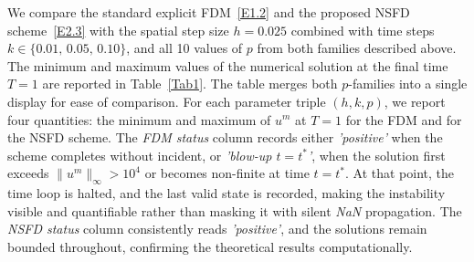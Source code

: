 \documentclass[final,12pt,3p]{elsarticle}
\theoremstyle{plain}
\theoremstyle{definition}
\theoremstyle{remark}
\begin{document}
We compare the standard explicit FDM~\eqref{E1.2} and the proposed NSFD scheme~\eqref{E2.3} with the spatial step size $h=0.025$
combined with time steps $k \in \{0.01,\, 0.05,\, 0.10\}$, and all 10 values of $p$ from both families described above.
The minimum and maximum values of the numerical solution at the final time $T = 1$ are reported in Table~\ref{Tab1}.
The table merges both $p$-families into a single display for ease of comparison.
%
For each parameter triple $(h, k, p)$, we report four quantities: the minimum and maximum of $u^m$ at $T=1$ for the FDM and for the NSFD scheme.
The \emph{FDM status} column records either 
\textit{'positive'}
when the scheme completes without incident, or
\textit{'blow-up $t = t^*$'},
when the solution first exceeds $\|u^m\|_\infty > 10^4$ or becomes non-finite at time $t = t^*$.
At that point, the time loop is halted, and the last valid state is recorded, making the instability visible and quantifiable rather than masking it with silent \textit{NaN} propagation.
The \textit{NSFD status} column consistently reads 
\textit{'positive'},
and the solutions remain bounded throughout, confirming the theoretical results computationally.
\end{document}
